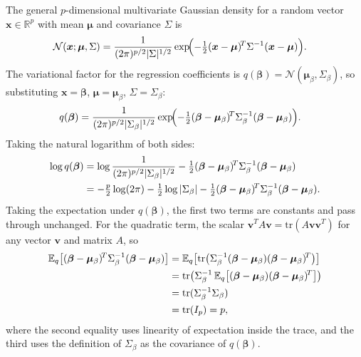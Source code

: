 \documentclass[11pt,a4paper]{article}
\begin{document}
The general $p$-dimensional multivariate Gaussian density for a random vector
$\bm{x}\in\mathbb{R}^p$ with mean $\bm{\mu}$ and covariance $\Sigma$ is
\begin{align}
  \mathcal{N}(\bm{x};\bm{\mu},\Sigma)
    &= \frac{1}{(2\pi)^{p/2}|\Sigma|^{1/2}}
       \exp\!\Bigl(-\tfrac{1}{2}(\bm{x}-\bm{\mu})^{\!T}
                   \Sigma^{-1}(\bm{x}-\bm{\mu})\Bigr).
\end{align}
The variational factor for the regression coefficients is
$q(\bm{\beta}) = \mathcal{N}(\bm{\mu}_\beta, \Sigma_\beta)$,
so substituting $\bm{x}=\bm{\beta}$, $\bm{\mu}=\bm{\mu}_\beta$, $\Sigma=\Sigma_\beta$:
\begin{align}
  q(\bm{\beta})
    &= \frac{1}{(2\pi)^{p/2}|\Sigma_\beta|^{1/2}}
       \exp\!\Bigl(-\tfrac{1}{2}(\bm{\beta}-\bm{\mu}_\beta)^{\!T}
                   \Sigma_\beta^{-1}(\bm{\beta}-\bm{\mu}_\beta)\Bigr).
\end{align}
Taking the natural logarithm of both sides:
\begin{align}
  \log q(\bm{\beta})
    &= \log\frac{1}{(2\pi)^{p/2}|\Sigma_\beta|^{1/2}}
       - \tfrac{1}{2}(\bm{\beta}-\bm{\mu}_\beta)^{\!T}\Sigma_\beta^{-1}(\bm{\beta}-\bm{\mu}_\beta)
       \notag\\
    &= -\tfrac{p}{2}\log(2\pi)
       - \tfrac{1}{2}\log|\Sigma_\beta|
       - \tfrac{1}{2}(\bm{\beta}-\bm{\mu}_\beta)^{\!T}\Sigma_\beta^{-1}(\bm{\beta}-\bm{\mu}_\beta).
\end{align}
Taking the expectation under $q(\bm{\beta})$, the first two terms are constants and pass through unchanged.
For the quadratic term, the scalar $\bm{v}^T A \bm{v} = \mathrm{tr}(A\bm{v}\bm{v}^T)$ for any vector $\bm{v}$
and matrix $A$, so
\begin{align}
  \mathbb{E}_q\bigl[(\bm{\beta}-\bm{\mu}_\beta)^{\!T}\Sigma_\beta^{-1}(\bm{\beta}-\bm{\mu}_\beta)\bigr]
    &= \mathbb{E}_q\bigl[\mathrm{tr}\bigl(\Sigma_\beta^{-1}
         (\bm{\beta}-\bm{\mu}_\beta)(\bm{\beta}-\bm{\mu}_\beta)^{\!T}\bigr)\bigr] \notag\\
    &= \mathrm{tr}\bigl(\Sigma_\beta^{-1}
         \,\mathbb{E}_q\bigl[(\bm{\beta}-\bm{\mu}_\beta)(\bm{\beta}-\bm{\mu}_\beta)^{\!T}\bigr]\bigr)
       \notag\\
    &= \mathrm{tr}(\Sigma_\beta^{-1}\Sigma_\beta) \notag\\
    &= \mathrm{tr}(I_p) = p,
\end{align}
where the second equality uses linearity of expectation inside the trace,
and the third uses the definition of $\Sigma_\beta$ as the covariance of $q(\bm{\beta})$.
\end{document}
